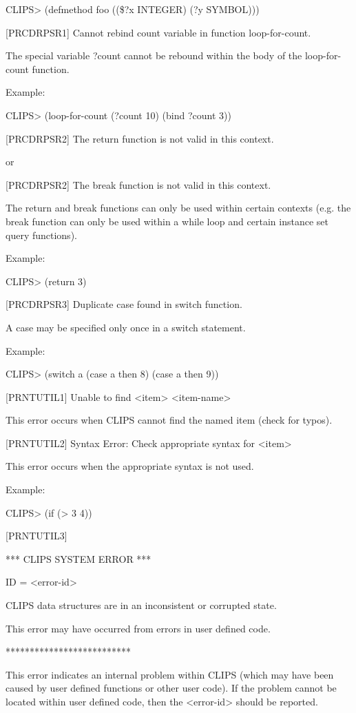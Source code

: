 \documentclass[letterpaper,10pt,english]{sphinxmanual}
\begin{document}
CLIPS\textgreater{} (defmethod foo ((\$?x INTEGER) (?y SYMBOL)))

{[}PRCDRPSR1{]} Cannot rebind count variable in function loop-for-count.

The special variable ?count cannot be rebound within the body of the
loop-for-count function.

Example:

CLIPS\textgreater{} (loop-for-count (?count 10) (bind ?count 3))

{[}PRCDRPSR2{]} The return function is not valid in this context.

or

{[}PRCDRPSR2{]} The break function is not valid in this context.

The return and break functions can only be used within certain contexts
(e.g. the break function can only be used within a while loop and
certain instance set query functions).

Example:

CLIPS\textgreater{} (return 3)

{[}PRCDRPSR3{]} Duplicate case found in switch function.

A case may be specified only once in a switch statement.

Example:

CLIPS\textgreater{} (switch a (case a then 8) (case a then 9))

{[}PRNTUTIL1{]} Unable to find \textless{}item\textgreater{} \textless{}item-name\textgreater{}

This error occurs when CLIPS cannot find the named item (check for
typos).

{[}PRNTUTIL2{]} Syntax Error: Check appropriate syntax for \textless{}item\textgreater{}

This error occurs when the appropriate syntax is not used.

Example:

CLIPS\textgreater{} (if (\textgreater{} 3 4))

{[}PRNTUTIL3{]}

*** CLIPS SYSTEM ERROR ***

ID = \textless{}error-id\textgreater{}

CLIPS data structures are in an inconsistent or corrupted state.

This error may have occurred from errors in user defined code.

**************************

This error indicates an internal problem within CLIPS (which may have
been caused by user defined functions or other user code). If the
problem cannot be located within user defined code, then the \textless{}error-id\textgreater{}
should be reported.
\end{document}
